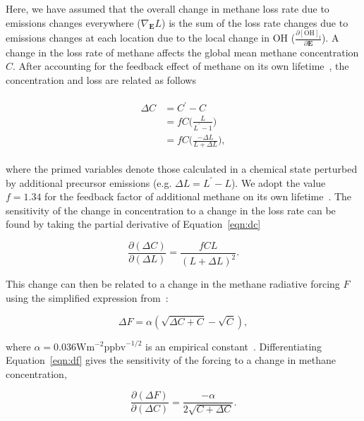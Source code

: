 Here, we have assumed that the overall change in methane loss rate due to emissions changes everywhere ($\nabla_\mathbf{E} L$) is the sum of the loss rate changes due to emissions changes at each location due to the local change in OH ($\frac{\partial \mathrm{[OH]_i}}{\partial \mathbf{E}}$). A change in the loss rate of methane affects the global mean methane concentration $C$. After accounting for the feedback effect of methane on its own lifetime~\citep{ref:fuglestvedt1999,ref:naik2005}, the concentration and loss are related as follows

\begin{equation}
\begin{align}
\begin{split}
\Delta C &= C^{\prime} - C \\
         &= f C \Big(\frac{L}{L^{\prime} - 1}\Big) \\
         &= fC\Big(\frac{-\Delta L}{L+\Delta L}\Big),
\end{split}
\label{eqn:dc}
\end{align}
\end{equation}

where the primed variables denote those calculated in a chemical state perturbed by additional precursor emissions (e.g. $\Delta L = L^{\prime}-L$).  We adopt the value $f=1.34$ for the feedback factor of additional methane on its own lifetime~\citep{ref:holmes2013}. The sensitivity of the change in concentration to a change in the loss rate can be found by taking the partial derivative of Equation~\ref{eqn:dc}

\begin{equation}
\frac{\partial (\Delta C)}{\partial (\Delta L)} = \frac{fCL}{(L+\Delta L)^2}.
\label{eqn:dcdl}
\end{equation}

This change can then be related to a change in the methane radiative forcing $F$ using the simplified expression from~\citet{ref:myhre1998}:

\begin{equation}
\Delta F = \alpha (\sqrt{\Delta C + C} - \sqrt{C}),
\label{eqn:df}
\end{equation}

where $\alpha=0.036 \mathrm{W}\mathrm{m}^{-2}\mathrm{ppbv}^{-1/2}$ is an empirical constant~\citep{ref:myhre1998}. Differentiating Equation~\ref{eqn:df} gives the sensitivity of the forcing to a change in methane concentration,

\begin{equation}
\frac{\partial (\Delta F)}{\partial (\Delta C)} = \frac{-\alpha}{2\sqrt{C+\Delta C}}.
\label{eqn:dfdc}
\end{equation}

